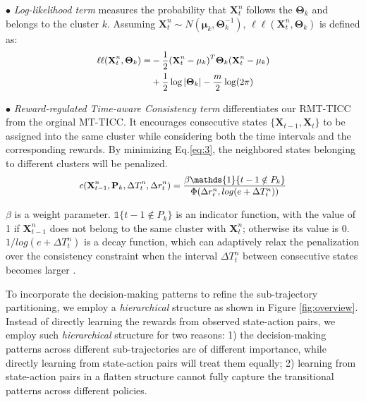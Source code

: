 \documentclass{article}
\begin{document}
\noindent $\bullet$ \textit{Log-likelihood term} measures the probability that $\mathbf{X}_{t}^{n}$ follows the $\mathbf{\Theta}_{k}$ and belongs to the cluster $k$. Assuming $\mathbf{X}_{t}^{n} \sim N(\mathbf{\mu}_{k}, \mathbf{\Theta}_{k}^{-1})$, $\ell\ell(\mathbf{X}_{t}^{n}, \mathbf{\Theta}_{k})$ is defined as:  
\vspace{-0.3cm}
\begin{align} 
\small
    \begin{split}
    \ell\ell(\mathbf{X}_{t}^{n}, \mathbf{\Theta}_{k}) = 
        & -\frac{1}{2}(\mathbf{X}_{t}^{n} - \mathbf{\mu}_{k})^{T} \mathbf{\Theta}_{k} (\mathbf{X}_{t}^{n} - \mathbf{\mu}_{k}) \\
        & + \frac{1}{2} \log |\mathbf{\Theta}_{k}| - \frac{m}{2}\log(2\pi)
        \label{eq:2}
    \end{split}
\end{align}


\noindent $\bullet$ \textit{Reward-regulated Time-aware Consistency term} differentiates our RMT-TICC from the orginal MT-TICC. It encourages consecutive states $\{\mathbf{X}_{t-1}, \mathbf{X}_{t}\}$ to be assigned into the same cluster while considering both the time intervals and the corresponding rewards. By minimizing Eq.\eqref{eq:3}, the neighbored states belonging to different clusters will be penalized. 
\begin{align} 
\small
    \begin{split}
    c(\mathbf{X}_{t-1}^{n}, \mathbf{P}_{k}, \Delta T^{n}_{t}, \Delta r^{n}_{t}) = \frac{\beta \mathds{1}\{t-1 \notin P_k\}}{\Phi(\Delta r^{n}_{t}, log(e+\Delta T^{n}_{t}))} 
        \label{eq:3}
    \end{split}
\end{align}

\noindent $\beta$ is a weight parameter. $\mathds{1}\{t-1 \notin P_k\}$ is an indicator function, with the value of 1 if $\mathbf{X}_{t-1}^{n}$ does not belong to the same cluster with $\mathbf{X}_{t}^{n}$; otherwise its value is 0. $1/log(e+\Delta T^{n}_{t})$ is a decay function, which can adaptively relax the penalization over the consistency constraint when the interval $\Delta T^{n}_{t}$ between consecutive states becomes larger \cite{baytas2017patient}.


To incorporate the decision-making patterns to refine the sub-trajectory partitioning, we employ a \emph{hierarchical} structure as shown in Figure \ref{fig:overview}. Instead of directly learning the rewards from observed state-action pairs, we employ such \emph{hierarchical} structure for two reasons: 1) the decision-making patterns across different sub-trajectories are of different importance, while directly learning from state-action pairs will treat them equally; 2) learning from state-action pairs in a flatten structure cannot fully capture the transitional patterns across different policies. 
\end{document}
